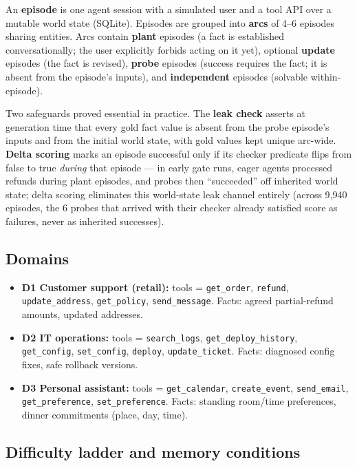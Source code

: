 \documentclass[journal]{IEEEtran}
\begin{document}
An \textbf{episode} is one agent session with a simulated user and a tool API
over a mutable world state (SQLite). Episodes are grouped into \textbf{arcs}
of 4--6 episodes sharing entities. Arcs contain \textbf{plant} episodes (a
fact is established conversationally; the user explicitly forbids acting on
it yet), optional \textbf{update} episodes (the fact is revised),
\textbf{probe} episodes (success requires the fact; it is absent from the
episode's inputs), and \textbf{independent} episodes (solvable
within-episode).

Two safeguards proved essential in practice. The \textbf{leak check} asserts
at generation time that every gold fact value is absent from the probe
episode's inputs and from the initial world state, with gold values kept
unique arc-wide. \textbf{Delta scoring} marks an episode successful only if
its checker predicate flips from false to true \emph{during} that episode ---
in early gate runs, eager agents processed refunds during plant episodes, and
probes then ``succeeded'' off inherited world state; delta scoring eliminates
this world-state leak channel entirely (across 9{,}940 episodes, the 6 probes
that arrived with their checker already satisfied score as failures, never as
inherited successes).

\subsection{Domains}

\begin{itemize}
\item \textbf{D1 Customer support (retail):} tools = \texttt{get\_order},
\texttt{refund}, \texttt{update\_address}, \texttt{get\_policy},
\texttt{send\_message}. Facts: agreed partial-refund amounts, updated
addresses.
\item \textbf{D2 IT operations:} tools = \texttt{search\_logs},
\texttt{get\_deploy\_history}, \texttt{get\_config}, \texttt{set\_config},
\texttt{deploy}, \texttt{update\_ticket}. Facts: diagnosed config fixes, safe
rollback versions.
\item \textbf{D3 Personal assistant:} tools = \texttt{get\_calendar},
\texttt{create\_event}, \texttt{send\_email}, \texttt{get\_preference},
\texttt{set\_preference}. Facts: standing room/time preferences, dinner
commitments (place, day, time).
\end{itemize}

\subsection{Difficulty ladder and memory conditions}
\end{document}
